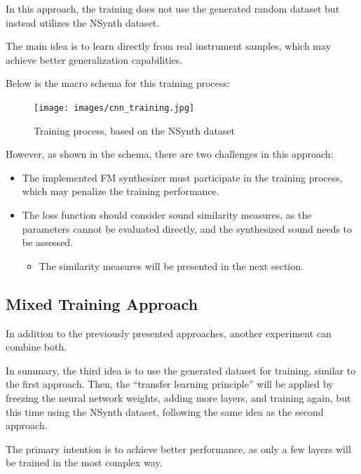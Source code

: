\documentclass[sigconf,natbib=false]{acmart}
\begin{document}

In this approach, the training does not use the generated random dataset but instead utilizes the NSynth dataset.

The main idea is to learn directly from real instrument samples, which may achieve better generalization capabilities.

Below is the macro schema for this training process:

\begin{figure}[htb]
 \caption{Training process, based on the NSynth dataset}
 \label{fig:cnn_training}
 \centering
 \texttt{[image: images/cnn\_training.jpg]}
\end{figure}

However, as shown in the schema, there are two challenges in this approach:

\begin{itemize}
    \item The implemented FM synthesizer must participate in the training process, which may penalize the training performance.
    \item The loss function should consider sound similarity measures, as the parameters cannot be evaluated directly, and the synthesized sound needs to be assessed.
    \begin{itemize}
        \item The similarity measures will be presented in the next section.
    \end{itemize}
\end{itemize}

\newpage

\subsection{Mixed Training Approach}

In addition to the previously presented approaches, another experiment can combine both.

In summary, the third idea is to use the generated dataset for training, similar to the first approach. Then, the ``transfer learning principle'' will be applied by freezing the neural network weights, adding more layers, and training again, but this time using the NSynth dataset, following the same idea as the second approach.

The primary intention is to achieve better performance, as only a few layers will be trained in the most complex way.
\end{document}
